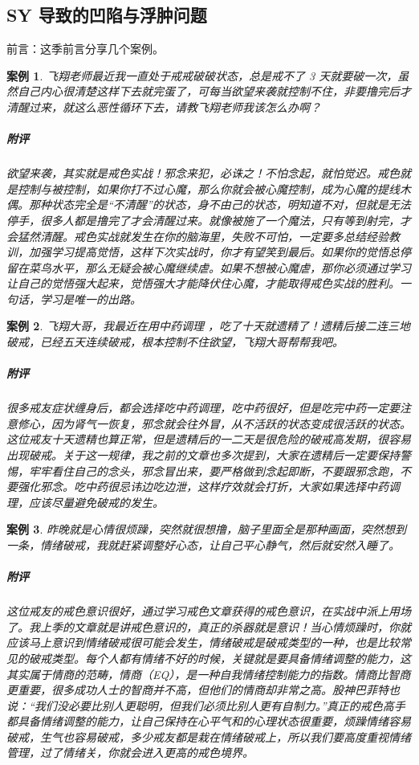 \documentclass{ctexart}
\newtheorem{case}{案例}
\begin{document}
\subsection{SY 导致的凹陷与浮肿问题}

前言：这季前言分享几个案例。

\begin{case}
    飞翔老师最近我一直处于戒戒破破状态，总是戒不了 3 天就要破一次，虽然自己内心很清楚这样下去就完蛋了，可每当欲望来袭就控制不住，非要撸完后才清醒过来，就这么恶性循环下去，请教飞翔老师我该怎么办啊？
    \subparagraph{附评} 欲望来袭，其实就是戒色实战！邪念来犯，必诛之！不怕念起，就怕觉迟。戒色就是控制与被控制，如果你打不过心魔，那么你就会被心魔控制，成为心魔的提线木偶。那种状态完全是“不清醒”的状态，身不由己的状态，明知道不对，但就是无法停手，很多人都是撸完了才会清醒过来。就像被施了一个魔法，只有等到射完，才会猛然清醒。戒色实战就发生在你的脑海里，失败不可怕，一定要多总结经验教训，加强学习提高觉悟，这样下次实战时，你才有望笑到最后。如果你的觉悟总停留在菜鸟水平，那么无疑会被心魔继续虐。如果不想被心魔虐，那你必须通过学习让自己的觉悟强大起来，觉悟强大才能降伏住心魔，才能取得戒色实战的胜利。一句话，学习是唯一的出路。
\end{case}

\begin{case}
    飞翔大哥，我最近在用中药调理 ，吃了十天就遗精了！遗精后接二连三地破戒，已经五天连续破戒，根本控制不住欲望，飞翔大哥帮帮我吧。
    \subparagraph{附评} 很多戒友症状缠身后，都会选择吃中药调理，吃中药很好，但是吃完中药一定要注意修心，因为肾气一恢复，邪念就会往外冒，从不活跃的状态变成很活跃的状态。这位戒友十天遗精也算正常，但是遗精后的一二天是很危险的破戒高发期，很容易出现破戒。关于这一规律，我之前的文章也多次提到，大家在遗精后一定要保持警惕，牢牢看住自己的念头，邪念冒出来，要严格做到念起即断，不要跟邪念跑，不要强化邪念。吃中药很忌讳边吃边泄，这样疗效就会打折，大家如果选择中药调理，应该尽量避免破戒的发生。
\end{case}

\begin{case}
    昨晚就是心情很烦躁，突然就很想撸，脑子里面全是那种画面，突然想到一条，情绪破戒，我就赶紧调整好心态，让自己平心静气，然后就安然入睡了。
    \subparagraph{附评} 这位戒友的戒色意识很好，通过学习戒色文章获得的戒色意识，在实战中派上用场了。我上季的文章就是讲戒色意识的，真正的杀器就是意识！当心情烦躁时，你就应该马上意识到情绪破戒很可能会发生，情绪破戒是破戒类型的一种，也是比较常见的破戒类型。每个人都有情绪不好的时候，关键就是要具备情绪调整的能力，这其实属于情商的范畴，情商（EQ），是一种自我情绪控制能力的指数。情商比智商更重要，很多成功人士的智商并不高，但他们的情商却非常之高。股神巴菲特也说：“我们没必要比别人更聪明，但我们必须比别人更有自制力。”真正的戒色高手都具备情绪调整的能力，让自己保持在心平气和的心理状态很重要，烦躁情绪容易破戒，生气也容易破戒，多少戒友都是栽在情绪破戒上，所以我们要高度重视情绪管理，过了情绪关，你就会进入更高的戒色境界。
\end{case}
\end{document}
